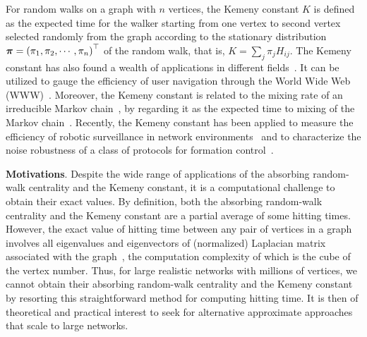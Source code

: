 \documentclass[10pt,twocolumn,twoside]{IEEEtran}
\begin{document}
For random walks on a graph with \(n\) vertices, the Kemeny constant \(K\) is defined as the expected time for the walker starting from one vertex to second vertex selected randomly from the graph according to the stationary distribution \(\boldsymbol{\pi}=\left(\pi_1, \pi_2, \cdots, \pi_n\right)^{\top}\) of the random walk, that is, \(K=\sum_{j} \pi_j H_{ij}\).
The Kemeny constant has also found a wealth of applications in different fields~\cite{Hu14}.
It can be utilized to gauge the efficiency of user navigation through the World Wide Web (WWW)~\cite{LeLo02}.
Moreover, the Kemeny constant is related to the mixing rate of an irreducible Markov chain~\cite{LePeWi09}, by regarding it as the expected time to mixing of the Markov chain~\cite{Hu06}.
Recently, the Kemeny constant has been applied to measure the efficiency of robotic surveillance in network environments~\cite{PaAgBu15} and to characterize the noise robustness of a class of protocols for formation control~\cite{JaOl19}.

\textbf{Motivations}. Despite the wide range of applications of the absorbing random-walk centrality and the Kemeny constant, it is a computational challenge to obtain their exact values.
By definition, both the absorbing random-walk centrality and the Kemeny constant are a partial average of some hitting times.
However, the exact value of hitting time between any pair of vertices in a graph involves all eigenvalues and eigenvectors of (normalized) Laplacian matrix associated with the graph~\cite{Lo93,LiZh13PRE}, the computation complexity of which is the cube of the vertex number.
Thus, for large realistic networks with millions of vertices, we cannot obtain their absorbing random-walk centrality and the Kemeny constant by resorting this straightforward method for computing hitting time. It is then of theoretical and practical interest to seek for alternative approximate approaches that scale to large networks.

\end{document}
